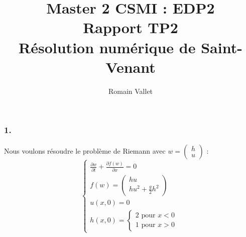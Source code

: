 \documentclass{article}
\title{Master 2 CSMI : EDP2\\Rapport TP2\\Résolution numérique de Saint-Venant}
\author{Romain Vallet}
\begin{document}
\maketitle

\subsubsection*{1.}

Nous voulons résoudre le problème de Riemann avec $w = \begin{pmatrix} h \\ u \end{pmatrix}$ :
\[ \left\{ \begin{matrix}
    \frac{\partial w}{\partial t} + \frac{\partial f(w)}{\partial x} = 0 \\
    f(w) = \begin{pmatrix} hu \\ hu^2+ \frac{g}{2} h^2 \end{pmatrix} \\
    u(x,0) = 0 \\
    h(x,0) = \left\{ \begin{matrix} 2 \text{ pour } x < 0 \\ 1 \text{ pour } x > 0 \end{matrix} \right.
\end{matrix} \right. \]
\end{document}
